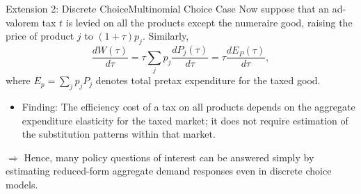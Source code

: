 \documentclass{beamer}
\begin{document}
\begin{frame}{Extension 2: Discrete Choice}{Multinomial Choice Case}
	Now suppose that an ad-valorem tax $t$ is levied on all the products except the numeraire good, raising the price of product $j$ to $(1+\tau)p_j$. Similarly,
	\begin{equation}
		\frac{dW(\tau)}{d\tau} = \tau\sum_j p_j\frac{dP_j(\tau)}{d\tau} = \tau\frac{dE_P(\tau)}{d\tau},
	\end{equation}
	where $E_p=\sum_j p_jP_j$ denotes total pretax expenditure for the taxed good.
	\begin{itemize}
		\item Finding: The efficiency cost of a tax on all products depends on the aggregate expenditure elasticity for the taxed market; it does not require estimation of the substitution patterns within that market.
	\end{itemize}
	\medskip

	$\Rightarrow$ Hence, many policy questions of interest can be answered simply by estimating reduced-form aggregate demand responses even in discrete choice models.
\end{frame}
\end{document}
